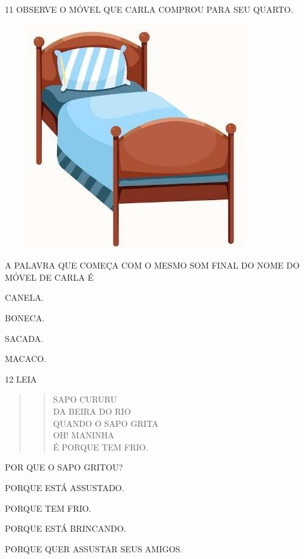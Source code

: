 \num{11} OBSERVE O MÓVEL QUE CARLA COMPROU PARA SEU QUARTO.

\begin{figure}[htpb]
\centering
\includegraphics[width=.2\textwidth]{media/image235.jpg}
\end{figure}

\pagebreak

A PALAVRA QUE COMEÇA COM O MESMO SOM FINAL DO NOME DO MÓVEL DE CARLA É 

\begin{escolha}
\item CANELA.

\item BONECA.

\item SACADA.

\item MACACO.
\end{escolha}

\num{12} LEIA

\begin{quote}
\begin{verse}
SAPO CURURU\\
DA BEIRA DO RIO\\
QUANDO O SAPO GRITA\\
OH! MANINHA\\
É PORQUE TEM FRIO.
\end{verse}

\end{quote}

POR QUE O SAPO GRITOU?

\begin{escolha}
\item PORQUE ESTÁ ASSUSTADO. 

\item PORQUE TEM FRIO.

\item PORQUE ESTÁ BRINCANDO.

\item PORQUE QUER ASSUSTAR SEUS AMIGOS.
\end{escolha}

